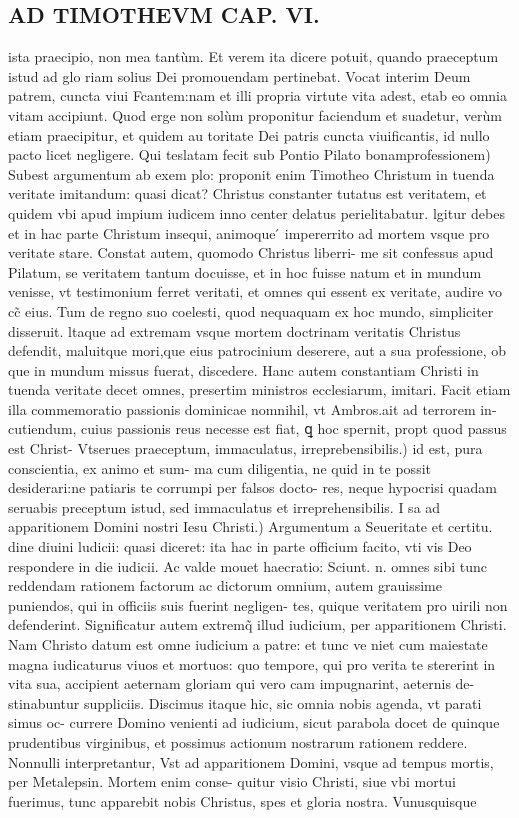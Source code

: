 \documentclass{article}
\begin{document}
\begin{pages}
\section*{AD TIMOTHEVM CAP. VI. }
\marginpar{[ p.129 ]}\pstart ista praecipio, non mea tantùm. Et verem ita dicere potuit, quando praeceptum istud ad glo riam solius Dei promouendam pertinebat. Vocat interim Deum patrem, cuncta viui Fcantem:nam et illi propria virtute vita adest, etab eo omnia vitam accipiunt. Quod erge non solùm proponitur faciendum et suadetur, verùm etiam praecipitur, et quidem au toritate Dei patris cuncta viuificantis, id nullo pacto licet negligere.  \pend\pstart Qui teslatam fecit sub Pontio Pilato bonamprofessionem) Subest argumentum ab exem plo: proponit enim Timotheo Christum in tuenda veritate imitandum: quasi dicat? Christus constanter tutatus est veritatem, et quidem vbi apud impium iudicem inno center delatus perielitabatur. lgitur debes et in hac parte Christum insequi, animoque ́ impererrito ad mortem vsque pro veritate stare. Constat autem, quomodo Christus liberri- me sit confessus apud Pilatum, se veritatem tantum docuisse, et in hoc fuisse natum et in mundum venisse, vt testimonium ferret veritati, et omnes qui essent ex veritate, audire vo cc̃ eius. Tum de regno suo coelesti, quod nequaquam ex hoc mundo, simpliciter disseruit. ltaque ad extremam vsque mortem doctrinam veritatis Christus defendit, maluitque mori,que eius patrocinium deserere, aut a sua professione, ob que in mundum missus fuerat, discedere. Hanc autem constantiam Christi in tuenda veritate decet omnes, presertim ministros ecclesiarum, imitari. Facit etiam illa commemoratio passionis dominicae nomnihil, vt Ambros.ait ad terrorem in- cutiendum, cuius passionis reus necesse est fiat, ꝗ hoc spernit, propt quod passus est Christ- Vtserues praeceptum, immaculatus, irreprebensibilis.) id est, pura conscientia, ex animo et sum- ma cum diligentia, ne quid in te possit desiderari:ne patiaris te corrumpi per falsos docto- res, neque hypocrisi quadam seruabis preceptum istud, sed immaculatus et irreprehensibilis. I sa ad apparitionem Domini nostri Iesu Christi.) Argumentum a Seueritate et certitu. dine diuini ludicii: quasi diceret: ita hac in parte officium facito, vti vis Deo respondere in die iudicii. Ac valde mouet haecratio: Sciunt. n. omnes sibi tunc reddendam rationem factorum ac dictorum omnium, autem grauissime puniendos, qui in officiis suis fuerint negligen- tes, quique veritatem pro uirili non defenderint. Significatur autem extremq̃ illud iudicium, per apparitionem Christi. Nam Christo datum est omne iudicium a patre: et tunc ve niet cum maiestate magna iudicaturus viuos et mortuos: quo tempore, qui pro verita te stererint in vita sua, accipient aeternam gloriam qui vero cam impugnarint, aeternis de- stinabuntur suppliciis. Discimus itaque hic, sic omnia nobis agenda, vt parati simus oc- currere Domino venienti ad iudicium, sicut parabola docet de quinque prudentibus virginibus, et possimus actionum nostrarum rationem reddere. Nonnulli interpretantur, Vst ad apparitionem Domini, vsque ad tempus mortis, per Metalepsin. Mortem enim conse- quitur visio Christi, siue vbi mortui fuerimus, tunc apparebit nobis Christus, spes et gloria nostra. Vunusquisque 
\end{pages}
\end{document}
